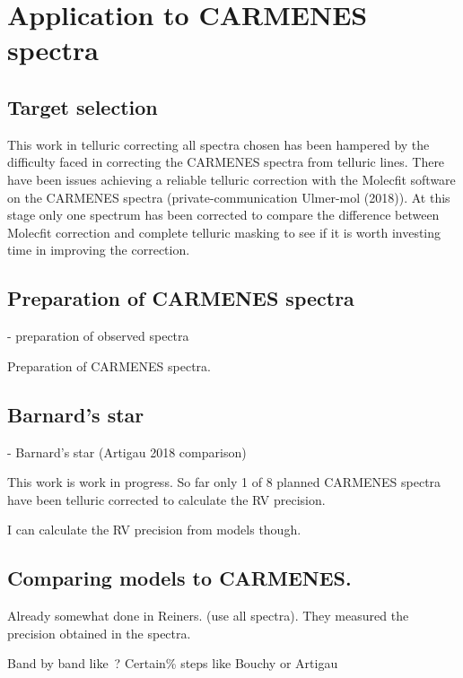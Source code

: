 
\section{Application to {CARMENES} spectra}


\subsection{Target selection}
This work in telluric correcting all spectra chosen has been hampered by the difficulty faced in correcting the CARMENES spectra from telluric lines.
There have been issues achieving a reliable telluric correction with the Molecfit software on the {CARMENES} spectra (private-communication Ulmer-mol (2018)).
At this stage only one spectrum has been corrected to compare the difference between Molecfit correction and complete telluric masking to see if it is worth investing time in improving the correction.


\citep{passegger_carmenes_2018, rajpurohit_exploring_2018}

\subsection{Preparation of CARMENES spectra}
- preparation of observed spectra

Preparation of {CARMENES} spectra.



\subsection{Barnard's star}
- Barnard's star (Artigau 2018 comparison)


This work is work in progress.
So far only 1 of 8 planned {CARMENES} spectra have been telluric corrected to calculate the {RV} precision.

{I can calculate the {RV} precision from models though.}




\subsection{Comparing models to {CARMENES}.}
Already somewhat done in Reiners.
(use all spectra).
They measured the precision obtained in the spectra.

Band by band like~\citet{figueira_radial_2016}?
Certain\% steps like Bouchy or Artigau


